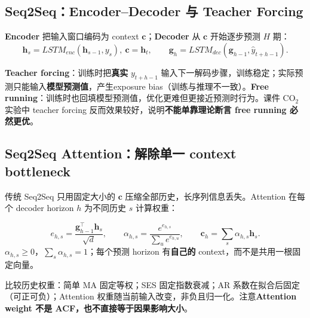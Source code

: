 \documentclass[UTF8,fontset=fandol,10.5pt,a4paper]{ctexart}
\newcommand{\eng}[1]{{\sffamily\color{navy}#1}}
\begin{document}
\subsection{Seq2Seq：Encoder--Decoder 与 Teacher Forcing}
\textbf{Encoder} 把输入窗口编码为 context $\mathbf c$；\textbf{Decoder} 从 $\mathbf c$ 开始逐步预测 $H$ 期：
\[\mathbf h_s=LSTM_{enc}(\mathbf h_{s-1},y_s),\ \mathbf c=\mathbf h_t,\qquad\mathbf g_h=LSTM_{dec}(\mathbf g_{h-1},\hat y_{t+h-1}).\]
\par\smallskip{}\par\smallskip
\textbf{Teacher forcing}：训练时把\textbf{真实} $y_{t+h-1}$ 输入下一解码步骤，训练稳定；实际预测只能输入\textbf{模型预测值}，产生\eng{exposure bias}（训练与推理不一致）。\textbf{Free running}：训练时也回填模型预测值，优化更难但更接近预测时行为。课件 CO$_2$ 实验中 teacher forcing 反而效果较好，说明\textbf{不能单靠理论断言 free running 必然更优}。
\subsection{Seq2Seq Attention：解除单一 context bottleneck}
传统 Seq2Seq 只用固定大小的 $\mathbf c$ 压缩全部历史，长序列信息丢失。\eng{Attention} 在每个 decoder horizon $h$ 为不同历史 $s$ 计算权重：
\begin{keybox}
\[e_{h,s}=\frac{\mathbf g_{h-1}^\top\mathbf h_s}{\sqrt d},\qquad \alpha_{h,s}=\frac{e^{e_{h,s}}}{\sum_{u}e^{e_{h,u}}},\qquad \mathbf c_h=\sum_s\alpha_{h,s}\mathbf h_s.\]
$\alpha_{h,s}\ge0$，$\sum_s\alpha_{h,s}=1$；每个预测 horizon 有\textbf{自己的} context，而不是共用一根固定向量。
\end{keybox}
\par\smallskip{}\par\smallskip
比较历史权重：简单 MA 固定等权；SES 固定指数衰减；AR 系数在拟合后固定（可正可负）；Attention 权重随当前输入改变，非负且归一化。注意\textbf{Attention weight 不是 ACF，也不直接等于因果影响大小}。
\end{document}
